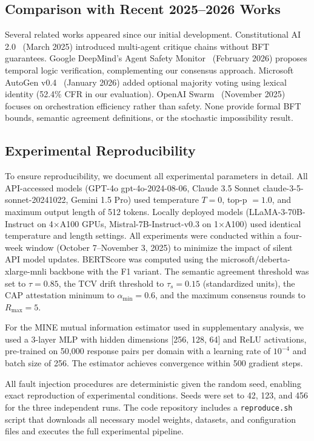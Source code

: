 \documentclass[journal,10pt]{IEEEtran}
\begin{document}
\subsection{Comparison with Recent 2025--2026 Works}

Several related works appeared since our initial development. Constitutional AI 2.0~\cite{r34} (March 2025) introduced multi-agent critique chains without BFT guarantees. Google DeepMind's Agent Safety Monitor~\cite{r35} (February 2026) proposes temporal logic verification, complementing our consensus approach. Microsoft AutoGen v0.4~\cite{r36} (January 2026) added optional majority voting using lexical identity (52.4\% CFR in our evaluation). OpenAI Swarm~\cite{r37} (November 2025) focuses on orchestration efficiency rather than safety. None provide formal BFT bounds, semantic agreement definitions, or the stochastic impossibility result.

\subsection{Experimental Reproducibility}

To ensure reproducibility, we document all experimental parameters in detail. All API-accessed models (GPT-4o gpt-4o-2024-08-06, Claude 3.5 Sonnet claude-3-5-sonnet-20241022, Gemini 1.5 Pro) used temperature $T=0$, top-p $=1.0$, and maximum output length of 512 tokens. Locally deployed models (LLaMA-3-70B-Instruct on 4$\times$A100 GPUs, Mistral-7B-Instruct-v0.3 on 1$\times$A100) used identical temperature and length settings. All experiments were conducted within a four-week window (October 7--November 3, 2025) to minimize the impact of silent API model updates. BERTScore was computed using the microsoft/deberta-xlarge-mnli backbone with the F1 variant. The semantic agreement threshold was set to $\tau = 0.85$, the TCV drift threshold to $\tau_s = 0.15$ (standardized units), the CAP attestation minimum to $\alpha_{\min} = 0.6$, and the maximum consensus rounds to $R_{\max} = 5$.

For the MINE mutual information estimator used in supplementary analysis, we used a 3-layer MLP with hidden dimensions [256, 128, 64] and ReLU activations, pre-trained on 50{,}000 response pairs per domain with a learning rate of $10^{-4}$ and batch size of 256. The estimator achieves convergence within 500 gradient steps.

All fault injection procedures are deterministic given the random seed, enabling exact reproduction of experimental conditions. Seeds were set to 42, 123, and 456 for the three independent runs. The code repository includes a \texttt{reproduce.sh} script that downloads all necessary model weights, datasets, and configuration files and executes the full experimental pipeline.
\end{document}
